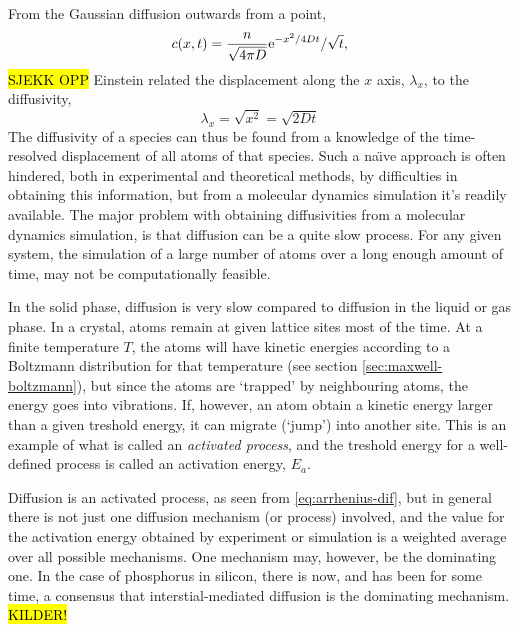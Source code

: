 \documentclass[11pt,bibliography=totoc,index=totoc]{scrbook}   %
\newcommand{\comment}[1]{\hl{#1}}
\begin{document}
From the Gaussian diffusion outwards from a point,
\begin{equation}
    c(x,t) = \frac{n}{\sqrt{4\pi D}} \mathrm{e}^{-x^2/4Dt} / \sqrt{t},
\end{equation}
\comment{SJEKK OPP}
Einstein related the displacement along the $x$ axis, $\lambda_x$, to the diffusivity\cite{Einstein:1905},
\begin{equation}
    \lambda_x = \sqrt{x^2} = \sqrt{2Dt}
  \label{eq:einsteinRelationSimple}
\end{equation}
The diffusivity of a species can thus be found from a knowledge of the time-resolved displacement of all atoms of that species.
Such a na\"{\i}ve approach is often hindered, both in experimental and theoretical methods, by difficulties in obtaining this information, but from a molecular dynamics simulation it's readily available.
The major problem with obtaining diffusivities from a molecular dynamics simulation, is that diffusion can be a quite slow process.
For any given system, the simulation of a large number of atoms over a long enough amount of time, may not be computationally feasible.


In the solid phase, diffusion is very slow compared to diffusion in the liquid or gas phase. 
In a crystal, atoms remain at given lattice sites most of the time.
At a finite temperature $T$, the atoms will have kinetic energies according to a Boltzmann distribution for 
that temperature (see section \ref{sec:maxwell-boltzmann}),
but since the atoms are `trapped' by neighbouring atoms, the energy goes into vibrations. 
If, however, an atom obtain a kinetic energy larger than a given treshold energy, 
it can migrate (`jump') into another site.
This is an example of what is called an \emph{activated process}, and the treshold energy for a well-defined process is called an activation energy, $E_a$.

Diffusion is an activated process, as seen from \eqref{eq:arrhenius-dif}, 
but in general there is not just one diffusion mechanism (or process) involved, 
and the value for the activation energy obtained by experiment or simulation is a weighted average over all possible mechanisms.
One mechanism may, however, be the dominating one. In the case of phosphorus in silicon, 
there is now, and has been for some time, a consensus that interstial-mediated diffusion is the dominating mechanism. \comment{KILDER!}
\end{document}
